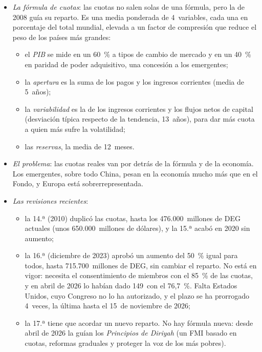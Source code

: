\documentclass[11pt]{article}
\begin{document}
\begin{itemize}
\item \emph{La fórmula de cuotas}: las cuotas no salen solas de una fórmula, pero la  de 2008 guía su reparto. Es una media ponderada de 4~variables, cada una en porcentaje del total mundial, elevada a un factor de compresión que reduce el peso de los países más grandes:
  \begin{itemize}
  \item el \emph{PIB} se mide en un 60~\% a tipos de cambio de mercado y en un 40~\% en paridad de poder adquisitivo, una concesión a los emergentes;
  \item la \emph{apertura} es la suma de los pagos y los ingresos corrientes (media de 5~años);
  \item la \emph{variabilidad} es la de los ingresos corrientes y los flujos netos de capital (desviación típica respecto de la tendencia, 13~años), para dar más cuota a quien más sufre la volatilidad;
  \item las \emph{reservas}, la media de 12~meses.
  \end{itemize}
\item \emph{El problema}: las cuotas reales van por detrás de la fórmula y de la economía. Los emergentes, sobre todo China, pesan en la economía mucho más que en el Fondo, y Europa está sobrerrepresentada.
\item \emph{Las revisiones recientes}: \begin{itemize}
    \item la 14.ª (2010) duplicó las cuotas, hasta los 476.000~millones de DEG actuales (unos 650.000~millones de dólares), y la 15.ª acabó en 2020 sin aumento;\nocite{FMI2026Cuotas}
    \item la 16.ª (diciembre de 2023) aprobó un aumento del 50~\% igual para todos, hasta 715.700~millones de DEG, sin cambiar el reparto. No está en vigor: necesita el consentimiento de miembros con el 85~\% de las cuotas, y en abril de 2026 lo habían dado 149~con el 76,7~\%. Falta Estados Unidos, cuyo Congreso no lo ha autorizado, y el plazo se ha prorrogado 4~veces, la última hasta el 15~de noviembre de 2026\nocite{FMI2026PlazoCuotas,CRS2026FMI};
    \item la 17.ª tiene que acordar un nuevo reparto. No hay fórmula nueva: desde abril de 2026 la guían los \emph{Principios de Diriyah} (un FMI basado en cuotas, reformas graduales y proteger la voz de los más pobres)\nocite{CMFI2026Bangkok}.
    \end{itemize}
\end{itemize}
\end{document}

